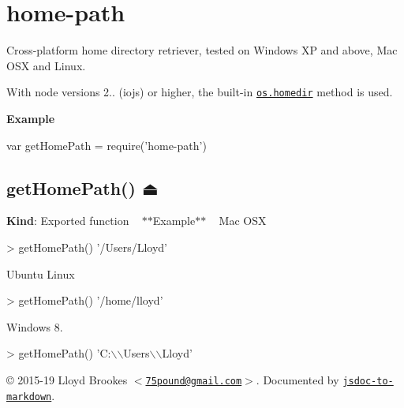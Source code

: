 \href{https://www.npmjs.org/package/home-path}{\tt } \href{https://www.npmjs.org/package/home-path}{\tt } \href{https://travis-ci.org/75lb/home-path}{\tt } \href{https://david-dm.org/75lb/home-path}{\tt } \href{https://github.com/feross/standard}{\tt }

\label{_module_home-path}%


\section*{home-\/path}

Cross-\/platform home directory retriever, tested on Windows XP and above, Mac O\+SX and Linux.

With node versions 2.. (iojs) or higher, the built-\/in \href{https://nodejs.org/api/os.html#os_os_homedir}{\tt {\ttfamily os.\+homedir}} method is used.

{\bfseries Example} 
\begin{DoxyCode}
var getHomePath = require('home-path')
\end{DoxyCode}
 \label{_exp_module_home-path--getHomePath}%


\subsection*{get\+Home\+Path() ⏏}

{\bfseries Kind}\+: Exported function ~\newline
$\ast$$\ast$\+Example$\ast$$\ast$ ~\newline
Mac O\+SX 
\begin{DoxyCode}
> getHomePath()
'/Users/Lloyd'
\end{DoxyCode}


Ubuntu Linux 
\begin{DoxyCode}
> getHomePath()
'/home/lloyd'
\end{DoxyCode}


Windows 8. 
\begin{DoxyCode}
> getHomePath()
'C:\(\backslash\)\(\backslash\)Users\(\backslash\)\(\backslash\)Lloyd'
\end{DoxyCode}






\copyright{} 2015-\/19 Lloyd Brookes $<$\href{mailto:75pound@gmail.com}{\tt 75pound@gmail.\+com}$>$. Documented by \href{https://github.com/jsdoc2md/jsdoc-to-markdown}{\tt jsdoc-\/to-\/markdown}. 
